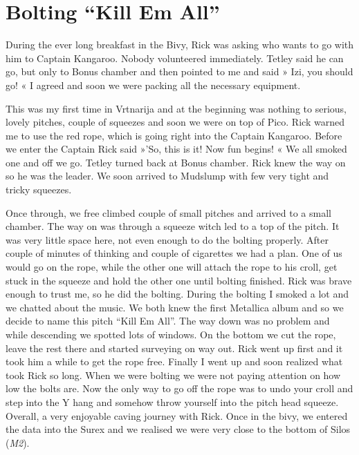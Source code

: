 \section{Bolting ``Kill Em All''}

During the ever long breakfast in the Bivy, Rick was asking who wants to
go with him to Captain Kangaroo. Nobody volunteered immediately. Tetley
said he can go, but only to Bonus chamber and then pointed to me and
said » Izi, you should go! « I agreed and soon we were packing all the
necessary equipment.

This was my first time in Vrtnarija and at the beginning was nothing to
serious, lovely pitches, couple of squeezes and soon we were on top of
Pico. Rick warned me to use the red rope, which is going right into the
Captain Kangaroo. Before we enter the Captain Rick said »'So, this is
it! Now fun begins! « We all smoked one and off we go. Tetley turned
back at Bonus chamber. Rick knew the way on so he was the leader. We
soon arrived to Mudslump with few very tight and tricky squeezes.

Once through, we free climbed couple of small pitches and arrived to a
small chamber. The way on was through a squeeze witch led to a top of
the pitch. It was very little space here, not even enough to do the
bolting properly. After couple of minutes of thinking and couple of
cigarettes we had a plan. One of us would go on the rope, while the
other one will attach the rope to his croll, get stuck in the squeeze
and hold the other one until bolting finished. Rick was brave enough to
trust me, so he did the bolting. During the bolting I smoked a lot and
we chatted about the music. We both knew the first Metallica album and
so we decide to name this pitch ``Kill Em All''. The way down was no
problem and while descending we spotted lots of windows. On the bottom
we cut the rope, leave the rest there and started surveying on way out.
Rick went up first and it took him a while to get the rope free. Finally
I went up and soon realized what took Rick so long. When we were bolting
we were not paying attention on how low the bolts are. Now the only way
to go off the rope was to undo your croll and step into the Y hang and
somehow throw yourself into the pitch head squeeze. Overall, a very
enjoyable caving journey with Rick. Once in the bivy, we entered the
data into the Surex and we realised we were very close to the bottom of
Silos (\emph{M2}).

